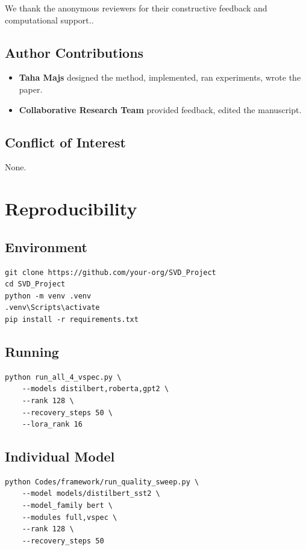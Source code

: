 We thank the anonymous reviewers for their constructive feedback and computational support..

\subsection{Author Contributions}

\begin{itemize}
\item \textbf{Taha Majs} designed the method, implemented, ran experiments, wrote
  the paper.
\item \textbf{Collaborative Research Team} provided feedback, edited the manuscript.

\end{itemize}
\subsection{Conflict of Interest}

None.



\section{Reproducibility}

\subsection{Environment}

\begin{lstlisting}
git clone https://github.com/your-org/SVD_Project
cd SVD_Project
python -m venv .venv
.venv\Scripts\activate
pip install -r requirements.txt
\end{lstlisting}

\subsection{Running}

\begin{lstlisting}
python run_all_4_vspec.py \
    --models distilbert,roberta,gpt2 \
    --rank 128 \
    --recovery_steps 50 \
    --lora_rank 16
\end{lstlisting}

\subsection{Individual Model}

\begin{lstlisting}
python Codes/framework/run_quality_sweep.py \
    --model models/distilbert_sst2 \
    --model_family bert \
    --modules full,vspec \
    --rank 128 \
    --recovery_steps 50
\end{lstlisting}

